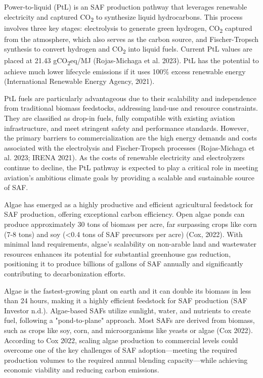 \documentclass[12pt]{article}
\begin{document}
Power-to-liquid (PtL) is an SAF production pathway that leverages renewable electricity and captured CO\textsubscript{2} to synthesize liquid hydrocarbons. This process involves three key stages: electrolysis to generate green hydrogen, CO\textsubscript{2} captured from the atmosphere, which also serves as the carbon source, and Fischer-Tropsch synthesis to convert hydrogen and CO\textsubscript{2} into liquid fuels. Current PtL values are placed at 21.43 gCO\textsubscript{2}eq/MJ (Rojas-Michaga et al. 2023).  PtL has the potential to achieve much lower lifecycle emissions if it uses 100\% excess renewable energy (International Renewable Energy Agency, 2021).

PtL fuels are particularly advantageous due to their scalability and independence from traditional biomass feedstocks, addressing land-use and resource constraints. They are classified as drop-in fuels, fully compatible with existing aviation infrastructure, and meet stringent safety and performance standards. However, the primary barriers to commercialization are the high energy demands and costs associated with the electrolysis and Fischer-Tropsch processes (Rojas-Michaga et al. 2023; IRENA 2021).  As the costs of renewable electricity and electrolyzers continue to decline, the PtL pathway is expected to play a critical role in meeting aviation's ambitious climate goals by providing a scalable and sustainable source of SAF.

Algae has emerged as a highly productive and efficient agricultural feedstock for SAF production, offering exceptional carbon efficiency. Open algae ponds can produce approximately 30 tons of biomass per acre, far surpassing crops like corn (7-8 tons) and soy (<0.4 tons of SAF precursors per acre) (Cox, 2022). With minimal land requirements, algae's scalability on non-arable land and wastewater resources enhances its potential for substantial greenhouse gas reduction, positioning it to produce billions of gallons of SAF annually and significantly contributing to decarbonization efforts.

Algae is the fastest-growing plant on earth and it can double its biomass in less than 24 hours, making it a highly efficient feedstock for SAF production (SAF Investor n.d.). Algae-based SAFs utilize sunlight, water, and nutrients to create fuel, following a "pond-to-plane" approach. Most SAFs are derived from biomass, such as crops like soy, corn, and microorganisms like yeasts or algae (Cox 2022). According to Cox 2022, scaling algae production to commercial levels could overcome one of the key challenges of SAF adoption—meeting the required production volumes to the required annual blending capacity—while achieving economic viability and reducing carbon emissions.
\end{document}
